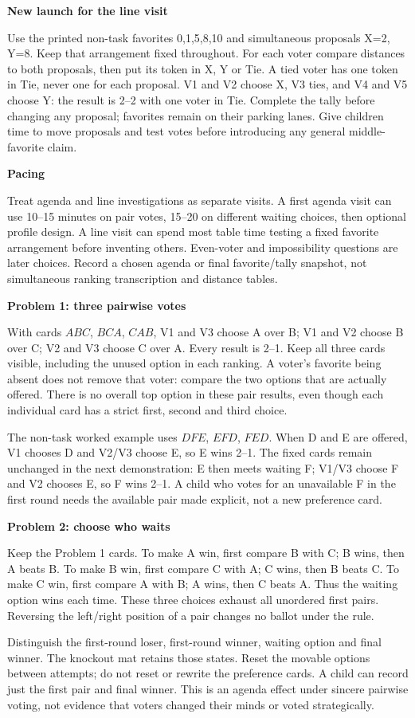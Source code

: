 \documentclass[11pt,letterpaper]{article}
\newcommand{\heading}[1]{\par\vspace{4pt}{\large\bfseries #1}\par}
\newcommand{\sub}[1]{\par\textbf{#1}\par}
\begin{document}
\sub{New launch for the line visit}
Use the printed non-task favorites 0,1,5,8,10 and simultaneous proposals X=2, Y=8. Keep that arrangement fixed throughout. For each voter compare distances to both proposals, then put its token in X, Y or Tie. A tied voter has one token in Tie, never one for each proposal. V1 and V2 choose X, V3 ties, and V4 and V5 choose Y: the result is 2--2 with one voter in Tie. Complete the tally before changing any proposal; favorites remain on their parking lanes. Give children time to move proposals and test votes before introducing any general middle-favorite claim.

\sub{Pacing}
Treat agenda and line investigations as separate visits. A first agenda visit can use 10--15 minutes on pair votes, 15--20 on different waiting choices, then optional profile design. A line visit can spend most table time testing a fixed favorite arrangement before inventing others. Even-voter and impossibility questions are later choices. Record a chosen agenda or final favorite/tally snapshot, not simultaneous ranking transcription and distance tables.
\newpage
\heading{Shared packet: fixed cards and agendas}
\sub{Problem 1: three pairwise votes}
With cards $ABC$, $BCA$, $CAB$, V1 and V3 choose A over B; V1 and V2 choose B over C; V2 and V3 choose C over A. Every result is 2--1. Keep all three cards visible, including the unused option in each ranking. A voter's favorite being absent does not remove that voter: compare the two options that are actually offered. There is no overall top option in these pair results, even though each individual card has a strict first, second and third choice.

The non-task worked example uses $DFE$, $EFD$, $FED$. When D and E are offered, V1 chooses D and V2/V3 choose E, so E wins 2--1. The fixed cards remain unchanged in the next demonstration: E then meets waiting F; V1/V3 choose F and V2 chooses E, so F wins 2--1. A child who votes for an unavailable F in the first round needs the available pair made explicit, not a new preference card.

\sub{Problem 2: choose who waits}
Keep the Problem 1 cards. To make A win, first compare B with C; B wins, then A beats B. To make B win, first compare C with A; C wins, then B beats C. To make C win, first compare A with B; A wins, then C beats A. Thus the waiting option wins each time. These three choices exhaust all unordered first pairs. Reversing the left/right position of a pair changes no ballot under the rule.

Distinguish the first-round loser, first-round winner, waiting option and final winner. The knockout mat retains those states. Reset the movable options between attempts; do not reset or rewrite the preference cards. A child can record just the first pair and final winner. This is an agenda effect under sincere pairwise voting, not evidence that voters changed their minds or voted strategically.
\end{document}
